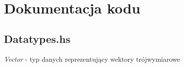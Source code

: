 \documentclass[11pt,a4paper]{article}
\begin{document}
\section{Dokumentacja kodu}
\subsection{Datatypes.hs}
\textit{Vector} - typ danych reprezentujący wektory trójwymiarowe
\end{document}
